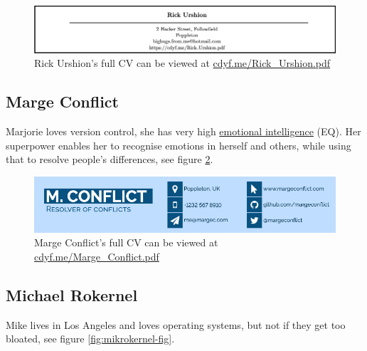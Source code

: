 \documentclass[
]{book}
\begin{document}
\begin{figure}

{\centering \includegraphics[width=1\linewidth]{images/rick_urshion} 

}

\caption{Rick Urshion's full CV can be viewed at \href{https://www.cdyf.me/Rick_Urshion.pdf}{cdyf.me/Rick\_Urshion.pdf}}\label{fig:rickurshion-fig}
\end{figure}



\hypertarget{marge-conflict}{%
\subsection{Marge Conflict}\label{marge-conflict}}

Marjorie loves version control, she has very high \href{https://en.wikipedia.org/wiki/Emotional_intelligence}{emotional intelligence} (EQ). Her superpower enables her to recognise emotions in herself and others, while using that to resolve people's differences, see figure \ref{fig:margeconflict-fig}.

\begin{figure}

{\centering \includegraphics[width=1\linewidth]{images/marge_conflict} 

}

\caption{Marge Conflict's full CV can be viewed at \href{https://www.cdyf.me/Marge_Conflict.pdf}{cdyf.me/Marge\_Conflict.pdf}}\label{fig:margeconflict-fig}
\end{figure}



\hypertarget{mike-rokernel}{%
\subsection{Michael Rokernel}\label{mike-rokernel}}

Mike lives in Los Angeles and loves operating systems, but not if they get too bloated, see figure \ref{fig:mikrokernel-fig}.
\end{document}
